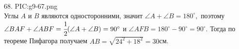 68. {{PIC:g9-67.png}}\\
Углы $A$ и $B$ являются односторонними, значит $\angle A+\angle B=180^\circ,$ поэтому $\angle BAF+\angle ABF=\cfrac{1}{2}(\angle A+\angle B)=90^\circ$ и $\angle AFB=180^\circ-90^\circ=90^\circ.$ Тогда по теореме Пифагора получаем $AB=\sqrt{24^2+18^2}=30$см.\\
